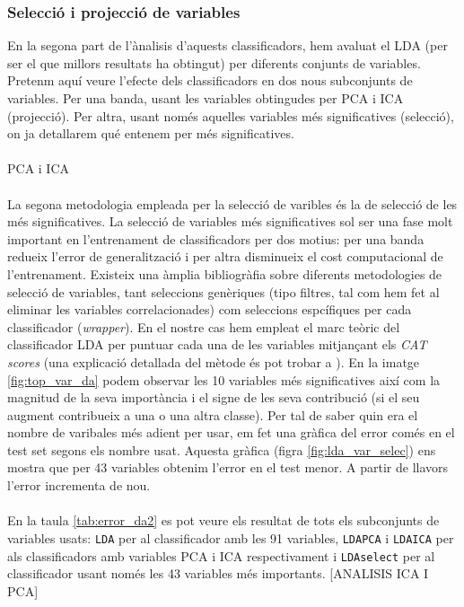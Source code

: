 \documentclass[a4paper,10pt]{article}
\begin{document}
\subsubsection{Selecció i projecció de variables}
En la segona part de l'ànalisis d'aquests classificadors, hem avaluat el LDA (per ser el que millors resultats ha obtingut) per diferents conjunts de variables. Pretenm aquí veure l'efecte dels classificadors en dos nous subconjunts de variables. Per una banda, usant les variables obtingudes per PCA i ICA (projecció). Per altra, usant només aquelles variables més significatives (selecció), on ja detallarem qué entenem per més significatives.  
\\
\\
PCA i ICA
\\
\\
La segona metodologia empleada per la selecció de varibles és la de selecció de les més significatives. La selecció de variables més significatives sol ser una fase molt important en l'entrenament de classificadors per dos motius: per una banda redueix l'error de generalització i per altra disminueix el cost computacional de l'entrenament. Existeix una àmplia bibliogràfia sobre diferents metodologies de selecció de variables, tant seleccions genèriques (tipo filtres, tal com hem fet al eliminar les variables correlacionades) com seleccions espcífiques per cada classificador (\textit{wrapper}). En el nostre cas hem empleat el marc teòric del classificador LDA per puntuar cada una de les variables mitjançant els \textit{CAT scores} (una explicació detallada del mètode és pot trobar a \cite{strimmer10}). En la imatge \ref{fig:top_var_da} podem observar les 10 variables més significatives així com la magnitud de la seva importància i el signe de les seva contribució (si el seu augment contribueix a una o una altra classe). Per tal de saber quin era el nombre de varibales més adient per usar, em fet una gràfica del error comés en el test set segons els nombre usat. Aquesta gràfica (figra \ref{fig:lda_var_selec}) ens mostra que per 43 variables obtenim l'error en el test menor. A partir de llavors l'error incrementa de nou.
\\
\\
En la taula \ref{tab:error_da2} es pot veure els resultat de tots els subconjunts de variables usats: \texttt{LDA} per al classificador amb les 91 variables, \texttt{LDAPCA} i \texttt{LDAICA} per als classificadors amb variables PCA i ICA respectivament i \texttt{LDAselect} per al classificador usant només les 43 variables més importants. [ANALISIS ICA I PCA]
\end{document}
